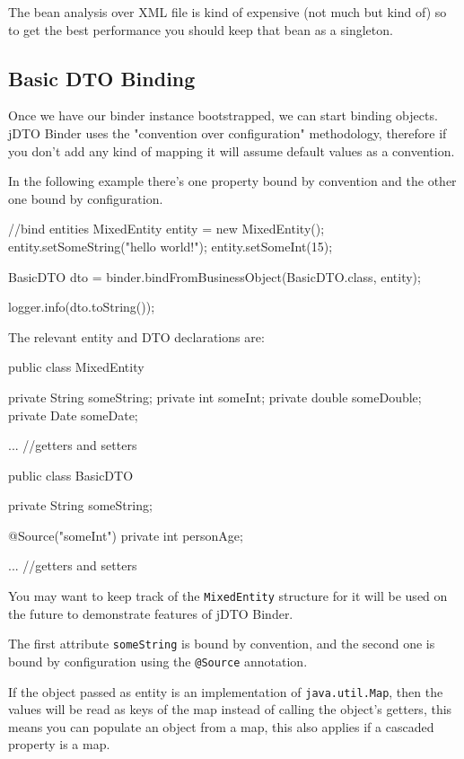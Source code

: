\documentclass[11pt]{article}
\newcommand{\JDTO}{jDTO Binder\xspace}
\begin{document}
The bean analysis over XML file is kind of expensive (not much but kind of) so to get the best performance you should keep that bean as a singleton.

\subsection{Basic DTO Binding}


Once we have our binder instance bootstrapped, we can start binding objects. \JDTO uses the "convention over configuration"
methodology, therefore if you don't add any kind of mapping it will assume default values as a convention. 


In the following example there's one property bound by convention and the other one bound by configuration.


\begin{java}
//bind entities
MixedEntity entity = new MixedEntity();
entity.setSomeString("hello world!");
entity.setSomeInt(15);
        
BasicDTO dto = binder.bindFromBusinessObject(BasicDTO.class, entity);
        
logger.info(dto.toString());
\end{java}

The relevant entity and DTO declarations are:


\begin{java}
 public class MixedEntity {
    private String someString;
    private int someInt;
    private double someDouble;
    private Date someDate;
    
    ... //getters and setters
}

public class BasicDTO {
    private String someString;
    
    @Source("someInt")
    private int personAge;
    
    ... //getters and setters
}
\end{java}

You may want to keep track of the \texttt{MixedEntity} structure for it will be used on the future
to demonstrate features of \JDTO.

The first attribute \texttt{someString} is bound by convention, and the second one is bound
by configuration using the \texttt{@Source} annotation.

If the object passed as entity is an implementation of \texttt{java.util.Map}, then the values will be read as keys of the map instead of calling the object's getters, this means you can populate an object from a map, this also applies if a cascaded property is a map. 
\end{document}
